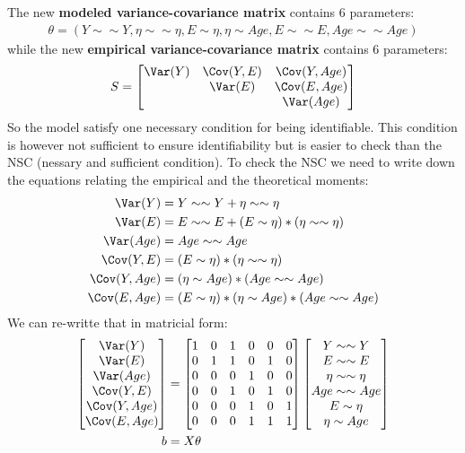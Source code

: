 \documentclass{article}
\begin{document}
The new \textbf{modeled variance-covariance matrix} contains 6 parameters:
\begin{align*}
\theta = \left( Y \sim \sim Y,  \eta \sim \sim \eta, E \sim \eta, \eta \sim Age, E \sim \sim E, Age \sim \sim Age \right)
\end{align*}
while the new \textbf{empirical variance-covariance matrix} contains 6 parameters:
\begin{align*}
S = 
\begin{bmatrix} 
\Var(Y) & \Cov(Y,E) & \Cov(Y,Age) \\ & \Var(E) & \Cov(E,Age) \\ && \Var(Age) \\
\end{bmatrix} 
\end{align*}
So the model satisfy one necessary condition for being
identifiable. This condition is however not sufficient to ensure
identifiability but is easier to check than the NSC (nessary and
sufficient condition). To check the NSC we need to write down the
equations relating the empirical and the theoretical moments:
\begin{align*}
\Var(Y) &= Y \sim \sim Y + \eta \sim \sim \eta \\
\Var(E) &= E \sim \sim E + (E \sim \eta) * (\eta \sim \sim \eta) \\
\Var(Age) &= Age \sim \sim Age \\
\Cov(Y,E) &= (E \sim \eta) * (\eta \sim \sim \eta) \\
\Cov(Y,Age) &= (\eta \sim Age) * (Age \sim \sim Age) \\
\Cov(E,Age) &= (E \sim \eta) * (\eta \sim Age) * (Age \sim \sim Age) \\
\end{align*}
We can re-writte that in matricial form:
\begin{align*}
\begin{bmatrix}
\Var(Y) \\
\Var(E) \\
\Var(Age) \\
\Cov(Y,E) \\
\Cov(Y,Age) \\
\Cov(E,Age) \\
\end{bmatrix}
& = \begin{bmatrix}
1&0&1&0&0&0\\
0&1&1&0&1&0\\
0&0&0&1&0&0\\
0&0&1&0&1&0\\
0&0&0&1&0&1\\
0&0&0&1&1&1\\
\end{bmatrix}
\begin{bmatrix}
Y \sim \sim Y \\
E \sim \sim E \\
\eta \sim \sim \eta \\
Age \sim \sim Age \\
E \sim \eta \\
\eta \sim Age \\
\end{bmatrix} \\
b &= X \theta
\end{align*}
\end{document}
